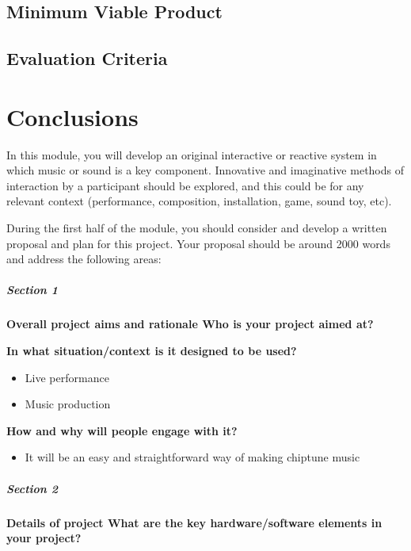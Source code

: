 \documentclass[]{article}
\begin{document}
    \subsection{Minimum Viable Product}
    \subsection{Evaluation Criteria}

\section{Conclusions}






In this module, you will develop an original interactive or reactive system
in which music or sound is a key component. Innovative and imaginative
 methods of interaction by a participant should be explored, and this
  could be for any relevant context (performance, composition, installation,
   game, sound toy, etc).
   
During the first half of the module, you should consider and develop a 
written proposal and plan for this project. Your proposal should be around 
2000 words and address the following areas:

\subparagraph[]{Section 1}
    \textbf{Overall project aims and rationale Who is your project aimed at?}

    \textbf{In what situation/context is it designed to be used?}
    
        \begin{itemize}
        \item Live performance
        \item Music production
        \end{itemize}

    \textbf{How and why will people engage with it?}

        \begin{itemize}
        \item It will be an easy and straightforward way of making chiptune music
        \end{itemize}

\subparagraph[]{Section 2}

    \textbf{Details of project What are the key hardware/software elements in your
    project?}
\end{document}
